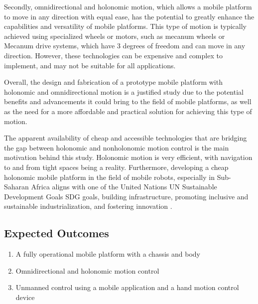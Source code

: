 Secondly, omnidirectional and holonomic motion, which allows a mobile platform to move in any direction with equal ease, has the potential to greatly enhance the capabilities and versatility of mobile platforms. This type of motion is typically achieved using specialized wheels or motors, such as mecanum wheels or Mecanum drive systems, which have 3 degrees of freedom and can move in any direction. However, these technologies can be expensive and complex to implement, and may not be suitable for all applications.

Overall, the design and fabrication of a prototype mobile platform with holonomic and omnidirectional motion is a justified study due to the potential benefits and advancements it could bring to the field of mobile platforms, as well as the need for a more affordable and practical solution for achieving this type of motion.

The apparent availability of cheap and accessible technologies that are bridging the gap between holonomic and nonholonomic motion control is the main motivation behind this study.
Holonomic motion is very efficient, with navigation to and from tight spaces being a reality. Furthermore, developing a cheap holonomic mobile platform in the field of mobile
robots, especially in Sub-Saharan Africa aligns with one of the United Nations \ac{UN}
Sustainable Development Goals \ac{SDG} goals, building infrastructure, promoting inclusive and sustainable industrialization, and fostering innovation \cite{noauthor_goal_nodate}. 

\subsection{Expected Outcomes}
\begin{enumerate}
    \item A fully operational mobile platform with a chassis and body
    \item Omnidirectional and holonomic motion control
    \item Unmanned control using a mobile application and a hand motion control device
\end{enumerate}